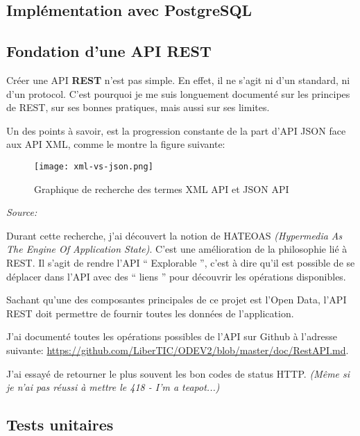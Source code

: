 \subsection{Implémentation avec PostgreSQL}

\subsection{Fondation d'une API REST}

Créer une API \textbf{REST} n'est pas simple. En effet, il ne s'agit ni d'un standard, ni d'un protocol. C'est pourquoi je me suis longuement documenté sur les principes de REST, sur ses bonnes pratiques, mais aussi sur ses limites. 

Un des points à savoir, est la progression constante de la part d'API JSON face aux API XML, comme le montre la figure suivante:

\begin{figure}[h]
\begin{center}
\texttt{[image: xml-vs-json.png]}
\end{center}
\caption{Graphique de recherche des termes XML API et JSON API}
\end{figure}

\textit{Source: }

Durant cette recherche, j'ai découvert la notion de HATEOAS \textit{(Hypermedia As The Engine Of Application State)}. C'est une amélioration de la philosophie lié à REST. Il s'agit de rendre l'API `` Explorable '', c'est à dire qu'il est possible de se déplacer dans l'API avec des `` liens '' pour découvrir les opérations disponibles.

Sachant qu'une des composantes principales de ce projet est l'Open Data, l'API REST doit permettre de fournir toutes les données de l'application.

J'ai documenté toutes les opérations possibles de l'API sur Github à l'adresse suivante: \url{https://github.com/LiberTIC/ODEV2/blob/master/doc/RestAPI.md}.

J'ai essayé de retourner le plus souvent les bon codes de status HTTP. \textit{(Même si je n'ai pas réussi à mettre le 418 - I'm a teapot...)}

\subsection{Tests unitaires}

